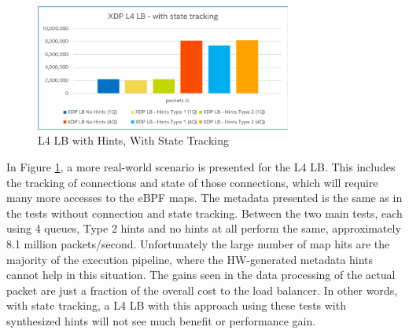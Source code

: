 \documentclass[letterpaper]{article}
\begin{document}
\begin{figure}[h]
\includegraphics[width=3.31in]{l4-perf-with-tracking.png}
\caption{L4 LB with Hints, With State Tracking}
\label{l4-perf-with-tracking}
\end{figure}
In Figure \ref{l4-perf-with-tracking}, a more real-world scenario is presented for the L4 LB.  This includes the tracking of connections and state of those connections, which will require many more accesses to the eBPF maps.  The metadata presented is the same as in the tests without connection and state tracking.
\newline
\newline
Between the two main tests, each using 4 queues, Type 2 hints and no hints at all perform the same, approximately 8.1 million packets/second.  Unfortunately the large number of map hits are the majority of the execution pipeline, where the HW-generated metadata hints cannot help in this situation.  The gains seen in the data processing of the actual packet are just a fraction of the overall cost to the load balancer.  In other words, with state tracking, a L4 LB with this approach using these tests with synthesized hints will not see much benefit or performance gain.
\end{document}
